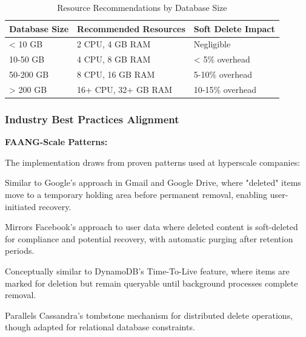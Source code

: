 \documentclass[12pt,a4paper]{article}
\begin{document}
\begin{tcolorbox}[colback=primaryblue!5, colframe=primaryblue, boxrule=1pt, arc=3pt, left=10pt, right=10pt, top=8pt, bottom=8pt]
\begin{table}[H]
\centering
\begin{tabular}{|p{4cm}|p{4cm}|p{5cm}|}
\hline
\textbf{Database Size} & \textbf{Recommended Resources} & \textbf{Soft Delete Impact} \\
\hline
< 10 GB & 2 CPU, 4 GB RAM & Negligible \\
\hline
10-50 GB & 4 CPU, 8 GB RAM & < 5\% overhead \\
\hline
50-200 GB & 8 CPU, 16 GB RAM & 5-10\% overhead \\
\hline
> 200 GB & 16+ CPU, 32+ GB RAM & 10-15\% overhead \\
\hline
\end{tabular}
\caption{Resource Recommendations by Database Size}
\end{table}

\subsubsection{Industry Best Practices Alignment}

\textbf{FAANG-Scale Patterns:}

The implementation draws from proven patterns used at hyperscale companies:

\begin{description}[leftmargin=2em, itemsep=8pt, style=nextline]
    \item[\textbf{Google's Deletion Model:}] Similar to Google's approach in Gmail and Google Drive, where "deleted" items move to a temporary holding area before permanent removal, enabling user-initiated recovery.
    
    \item[\textbf{Facebook's Archive Strategy:}] Mirrors Facebook's approach to user data where deleted content is soft-deleted for compliance and potential recovery, with automatic purging after retention periods.
    
    \item[\textbf{Amazon's DynamoDB TTL:}] Conceptually similar to DynamoDB's Time-To-Live feature, where items are marked for deletion but remain queryable until background processes complete removal.
    
    \item[\textbf{Netflix's Cassandra Tombstones:}] Parallels Cassandra's tombstone mechanism for distributed delete operations, though adapted for relational database constraints.
\end{description}


\end{tcolorbox}
\end{document}
